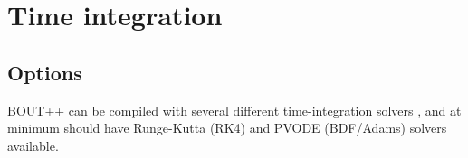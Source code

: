 \documentclass[12pt]{article}
\begin{document}





\section{Time integration}
%



\subsection{Options}
%
\label{sec:timeoptions}
%
%
BOUT++ can be compiled with several different time-integration solvers
, and at minimum should have Runge-Kutta (RK4) and PVODE (BDF/Adams) solvers
available.
\end{document}
